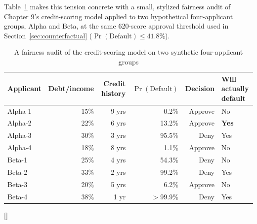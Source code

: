 \documentclass[../ai_in_finance]{subfiles}
\begin{document}
Table~\ref{tab:fairness_audit} makes this tension concrete with a small, stylized fairness audit of Chapter 9's credit-scoring model applied to two hypothetical four-applicant groups, Alpha and Beta, at the same 620-score approval threshold used in Section~\ref{sec:counterfactual} ($\Pr(\text{Default}) \le 41.8\%$).

\begin{table}[htbp]
\centering
\begin{lrbox}{\bookmeasuredbox}
\begin{tabular}{lrrrrl}
\toprule
Applicant & Debt/income & Credit history & $\Pr(\text{Default})$ & Decision & Will actually default \\
\midrule
Alpha-1 & 15\% & 9 yrs & 0.2\% & Approve & No \\
Alpha-2 & 22\% & 6 yrs & 13.2\% & Approve & \textbf{Yes} \\
Alpha-3 & 30\% & 3 yrs & 95.5\% & Deny & Yes \\
Alpha-4 & 18\% & 8 yrs & 1.1\% & Approve & No \\
\midrule
Beta-1 & 25\% & 4 yrs & 54.3\% & Deny & No \\
Beta-2 & 33\% & 2 yrs & 99.2\% & Deny & Yes \\
Beta-3 & 20\% & 5 yrs & 6.2\% & Approve & No \\
Beta-4 & 38\% & 1 yr & $>$99.9\% & Deny & Yes \\
\bottomrule
\end{tabular}
\end{lrbox}
\ifdim\wd\bookmeasuredbox<0.65\linewidth
\setlength{\bookcapwidth}{0.65\linewidth}
\else
\setlength{\bookcapwidth}{\wd\bookmeasuredbox}
\fi
{}[\bookcapwidth]{
\usebox{\bookmeasuredbox}
}{
\caption{A fairness audit of the credit-scoring model on two synthetic four-applicant groups}
\label{tab:fairness_audit}
}
\end{table}
\end{document}
